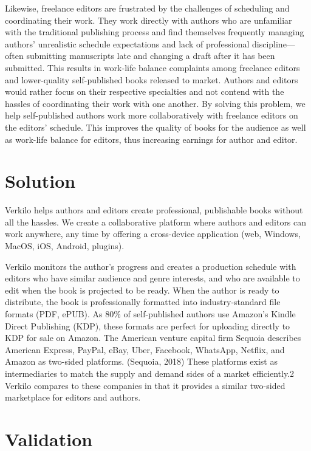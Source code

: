 \documentclass[10pt,openany]{book}
\begin{document}
Likewise, freelance editors are frustrated by the challenges of
scheduling and coordinating their work. They work directly with authors
who are unfamiliar with the traditional publishing process and find
themselves frequently managing authors' unrealistic schedule
expectations and lack of professional discipline---often submitting
manuscripts late and changing a draft after it has been submitted. This
results in work-life balance complaints among freelance editors and
lower-quality self-published books released to market. Authors and
editors would rather focus on their respective specialties and not
contend with the hassles of coordinating their work with one another. By
solving this problem, we help self-published authors work more
collaboratively with freelance editors on the editors' schedule. This
improves the quality of books for the audience as well as work-life
balance for editors, thus increasing earnings for author and editor.

\hypertarget{solution}{%
\section{Solution}\label{solution}}

Verkilo helps authors and editors create professional, publishable books
without all the hassles. We create a collaborative platform where
authors and editors can work anywhere, any time by offering a
cross-device application (web, Windows, MacOS, iOS, Android, plugins).

Verkilo monitors the author's progress and creates a production schedule
with editors who have similar audience and genre interests, and who are
available to edit when the book is projected to be ready. When the
author is ready to distribute, the book is professionally formatted into
industry-standard file formats (PDF, ePUB). As 80\% of self-published
authors use Amazon's Kindle Direct Publishing (KDP), these formats are
perfect for uploading directly to KDP for sale on Amazon. The American
venture capital firm Sequoia describes American Express, PayPal, eBay,
Uber, Facebook, WhatsApp, Netflix, and Amazon as two-sided platforms.
(Sequoia, 2018) These platforms exist as intermediaries to match the
supply and demand sides of a market efficiently.2 Verkilo compares to
these companies in that it provides a similar two-sided marketplace for
editors and authors.

\hypertarget{validation}{%
\section{Validation}\label{validation}}
\end{document}
